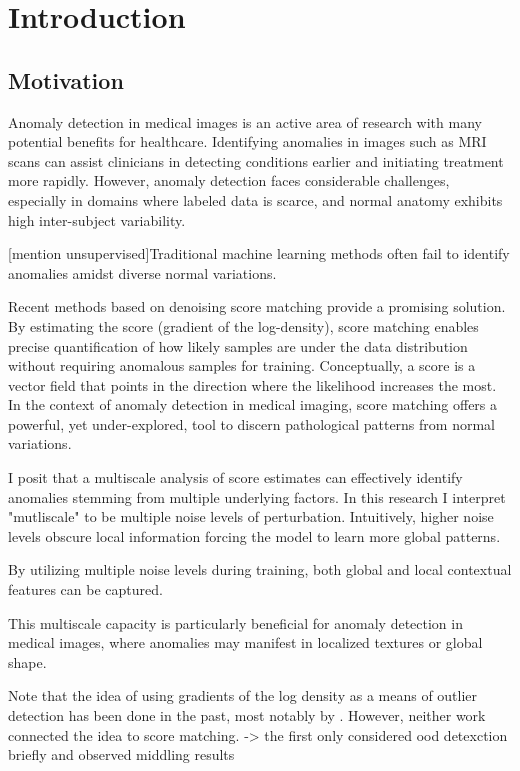 \chapter{Introduction}

\section{Motivation}

Anomaly detection in medical images is an active area of research with many potential benefits for healthcare. Identifying anomalies in images such as MRI scans can assist clinicians in detecting conditions earlier and initiating treatment more rapidly. However, anomaly detection faces considerable challenges, especially in domains where labeled data is scarce, and normal anatomy exhibits high inter-subject variability.

[mention unsupervised]Traditional machine learning methods often fail to identify anomalies amidst diverse normal variations.

Recent methods based on denoising score matching provide a promising solution. By estimating the score (gradient of the log-density), score matching enables precise quantification of how likely samples are under the data distribution without requiring anomalous samples for training. Conceptually, a score is a vector field that points in the direction where the likelihood increases the most. In the context of anomaly detection in medical imaging, score matching offers a powerful, yet under-explored, tool to discern pathological patterns from normal variations.

I posit that a multiscale analysis of score estimates can effectively identify anomalies stemming from multiple underlying factors. In this research I interpret "mutliscale" to be multiple noise levels of perturbation.
Intuitively, higher noise levels obscure local information forcing the model to learn more global patterns. 

By utilizing multiple noise levels during training, both global and local contextual features can be captured.

This multiscale capacity is particularly beneficial for anomaly detection in medical images, where anomalies may manifest in localized textures or global shape.

Note that the idea of using gradients of the log density  as a means of outlier detection has been done in the past, most notably by . However, neither work connected the idea to score matching. 
-> the first only considered ood detexction briefly and observed middling results


